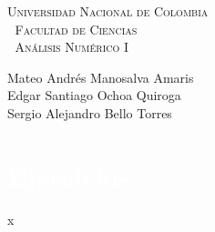 \documentclass[12pt, a4paper]{article}%
\begin{document}
\setlength{\parindent}{0cm}
\hoffset-0.46cm
\voffset-1.46cm

\begin{window}
\large\scshape  \hspace{0.4cm}\textsf{Universidad Nacional de Colombia} \\
\textcolor{white}{\tiny.}  \large \hspace{1.5cm} \textsf{Facultad de Ciencias} \\
\textcolor{white}{\tiny.}   \normalsize\hspace{2.2cm}\textsf{Análisis Numérico I}\\
 

\end{window}

\vspace{0.2cm}
\small
\textsf{Mateo Andrés Manosalva Amaris\\
Edgar Santiago Ochoa Quiroga\\
Sergio Alejandro Bello Torres} 
\normalsize
\dotfill
\vspace{0.7cm}

\section*{\textcolor{white}{Ejercicios}}
\vspace*{-2cm} %
x





\end{document}
